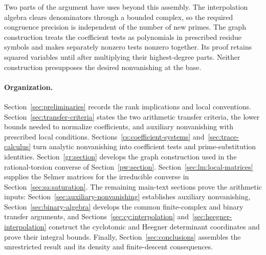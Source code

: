 Two parts of the argument have uses beyond this assembly. The
interpolation algebra clears denominators through a bounded complex,
so the required congruence precision is independent of the number of
new primes. The graph construction treats the coefficient tests as polynomials in
prescribed residue symbols and makes separately nonzero tests nonzero
together. Its proof retains squared variables until after multiplying
their highest-degree parts.
Neither construction presupposes the desired nonvanishing at the base.

\paragraph{Organization.}
Section~\ref{sec:preliminaries} records the rank implications and local
conventions. Section~\ref{sec:transfer-criteria} states the two arithmetic
transfer criteria, the lower bounds needed to normalize coefficients,
and auxiliary nonvanishing with prescribed local conditions.
Sections~\ref{cs:coefficient-systems} and~\ref{sec:trace-calculus}
turn analytic nonvanishing into coefficient tests and prime-substitution
identities. Section~\ref{gr:section} develops the graph construction
used in the rational-torsion converse of Section~\ref{pw:section}.
Section~\ref{sec:lm:local-matrices} supplies the Selmer matrices for
the irreducible converse in Section~\ref{sec:sa:saturation}.
The remaining main-text sections prove the arithmetic inputs:
Section~\ref{sec:auxiliary-nonvanishing} establishes auxiliary
nonvanishing, Section~\ref{sec:binary-algebra} develops the common
finite-complex and binary transfer arguments, and
Sections~\ref{sec:cy:interpolation} and~\ref{sec:heegner-interpolation}
construct the cyclotomic and Heegner determinant coordinates and prove
their integral bounds. Finally, Section~\ref{sec:conclusions} assembles the unrestricted
result and its density and finite-descent consequences.
